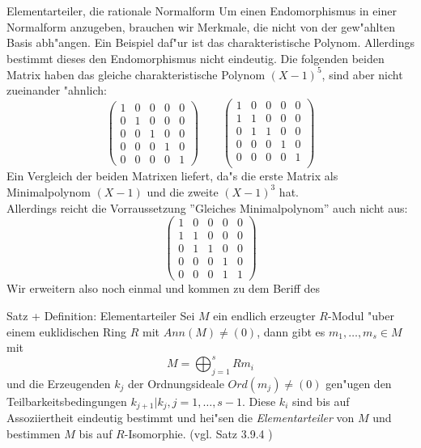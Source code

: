\documentclass[a4paper]{article}
\begin{document}
\begin{section}{Elementarteiler, die rationale Normalform}
Um einen Endomorphismus in einer Normalform anzugeben, brauchen wir Merkmale, die nicht von der gew"ahlten Basis abh"angen.
Ein Beispiel daf"ur ist das charakteristische Polynom. Allerdings bestimmt dieses den Endomorphismus nicht eindeutig. Die folgenden beiden Matrix haben das gleiche charakteristische Polynom $(X-1)^5$, sind aber nicht zueinander "ahnlich:
$$\left (\begin{array}{ccccc}
1 & 0 & 0 & 0 & 0\\
0 & 1 & 0 & 0 & 0\\
0 & 0 & 1 & 0 & 0\\
0 & 0 & 0 & 1 & 0\\
0 & 0 & 0 & 0 & 1
\end{array}\right )
\qquad \left ( \begin{array}{ccccc}
1 & 0 & 0 & 0 & 0\\
1 & 1 & 0 & 0 & 0\\
0 & 1 & 1 & 0 & 0\\
0 & 0 & 0 & 1 & 0\\
0 & 0 & 0 & 0 & 1\\
\end{array} \right )
$$
Ein Vergleich der beiden Matrixen liefert, da"s die erste Matrix als Minimalpolynom $(X-1)$ und die zweite $(X-1)^3$ hat.\\
Allerdings reicht die Vorraussetzung ''Gleiches Minimalpolynom'' auch nicht aus:
$$\left ( \begin{array}{cccccc}
1 & 0 & 0 & 0 & 0\\
1 & 1 & 0 & 0 & 0\\
0 & 1 & 1 & 0 & 0\\
0 & 0 & 0 & 1 & 0\\
0 & 0 & 0 & 1 & 1
\end{array} \right )$$
Wir erweitern also noch einmal und kommen zu dem Beriff des
\begin{subsection}{Satz + Definition: Elementarteiler}
Sei $M$ ein endlich erzeugter $R$-Modul "uber einem euklidischen Ring $R$ mit $Ann(M)\not=(0)$, dann gibt es $m_1,\ldots,m_s \in  M$ mit $$M=\bigoplus_{j=1}^s Rm_i$$ und die Erzeugenden $k_j$ der Ordnungsideale $Ord(m_j)\not=(0)$ gen"ugen den Teilbarkeitsbedingungen $k_{j+1}|k_j, j=1,\ldots,s-1$. Diese $k_i$ sind bis auf Assoziiertheit eindeutig bestimmt und hei"sen die \emph{Elementarteiler} von $M$ und bestimmen $M$ bis auf $R$-Isomorphie.
\label{elteiler}(vgl. Satz 3.9.4 \cite{vorlesung})\\\\

\end{subsection}
\end{section}
\end{document}
